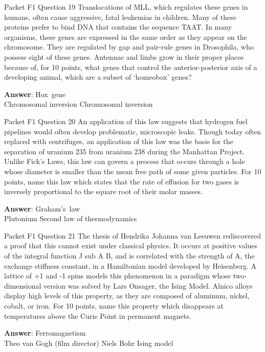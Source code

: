 \begin{frame}{Packet F1 Question 19}
Translocations of MLL,     which regulates these genes in humans,       often cause aggressive, fatal leukemias in children. Many of these proteins prefer to bind DNA that contains the sequence TAAT. In many organisms,   these genes are expressed in the same order as they appear on the chromosome. They are regulated by gap and pair-rule genes in Drosophila, who possess eight of these genes. Antennae and limbs grow in their proper places because of, for 10 points, what genes that control the anterior-posterior axis of a developing animal, which are a subset of `homeobox' genes?

\textbf{Answer}: Hox\ gene\\
 Chromosomal inversion
 Chromosomal inversion
\end{frame}

\begin{frame}{Packet F1 Question 20}
An application of this law suggests that hydrogen fuel pipelines would often develop problematic, microscopic leaks. Though today often replaced with centrifuges, an application of this law was the basis for the separation of uranium 235 from uranium 238 during the Manhattan Project. Unlike Fick’s Laws,     this law can govern a process that occurs through a hole   whose diameter is smaller than the mean free path of some given particles. For 10 points, name this law which states that the rate of effusion for two gases is   inversely proportional to the square root   of their molar masses.

\textbf{Answer}: Graham's\ law\\
 Plutonium
 Second law of thermodynamics
\end{frame}

\begin{frame}{Packet F1 Question 21}
The thesis of Hendrika Johanna van Leeuwen   rediscovered a proof   that this cannot exist under classical physics. It occurs at positive values of the integral function J sub A B, and is correlated with the strength of A, the exchange stiffness constant, in a Hamiltonian model developed by Heisenberg. A lattice of +1 and -1 spins models this phenomenon in a paradigm whose two-dimensional version was solved by Lars Onsager,     the Ising Model. Alnico alloys display high levels of this property, as they are composed of aluminum, nickel, cobalt,     or iron. For 10 points, name this property which disappears   at temperatures above the Curie Point in permanent magnets.

\textbf{Answer}: Ferromagnetism\\
 Theo van Gogh (film director)
 Niels Bohr
 Ising model
\end{frame}

